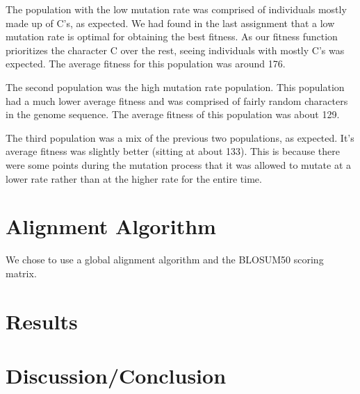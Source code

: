 \documentclass[a4paper, 12pt, one column]{article}
\begin{document}
\begin{multicols}{2}
The population with the low mutation rate was comprised of individuals mostly made up of C's, as expected. We had found in the last assignment that a low mutation rate is optimal for obtaining the best fitness. As our fitness function prioritizes the character C over the rest, seeing individuals with mostly C's was expected. The average fitness for this population was around 176.

The second population was the high mutation rate population. This population had a much lower average fitness and was comprised of fairly random characters in the genome sequence. The average fitness of this population was about 129. 

The third population was a mix of the previous two populations, as expected. It's average fitness was slightly better (sitting at about 133). This is because there were some points during the mutation process that it was allowed to mutate at a lower rate rather than at the higher rate for the entire time. 

\section{Alignment Algorithm}

We chose to use a global alignment algorithm and the BLOSUM50 scoring matrix. 

\section{Results}
\par
\section{Discussion/Conclusion}

\end{multicols}
\end{document}
